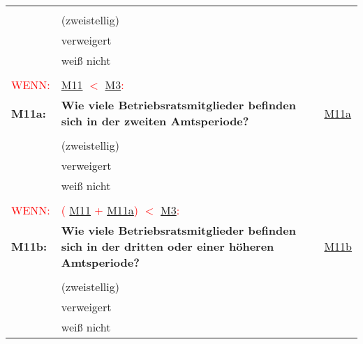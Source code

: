 \begin{longtable}{!{\color{black}\vline width 1pt}  L{2cm}!{\color{black}\vline width 1pt} L{12.25cm}!{\color{black}\vline width 1pt}  L{2.5cm}!{\color{black}\vline width 1pt}}
   &  &  \\ 
   & (zweistellig) &  \\ 
   & verweigert &  \\ 
   & weiß nicht &  \\ 
   &  &  \\ 
   \midrule
{}\textcolor{red}{WENN:} & \textcolor{red}{ \hyperref[M11]{M11} $<$  \hyperref[M3]{M3}:} &  \\ 
  \textbf{M11a:}\label{M11a} & \textbf{Wie viele Betriebsratsmitglieder befinden sich in der zweiten Amtsperiode?} & \hyperref[var:M11a]{M11a} \\ 
   &  &  \\ 
   & (zweistellig) &  \\ 
   & verweigert &  \\ 
   & weiß nicht &  \\ 
   &  &  \\ 
   \midrule
{}\textcolor{red}{WENN:} & \textcolor{red}{( \hyperref[M11]{M11} +  \hyperref[M11a]{M11a}) $<$  \hyperref[M3]{M3}:} &  \\ 
  \textbf{M11b:}\label{M11b} & \textbf{Wie viele Betriebsratsmitglieder befinden sich in der dritten oder einer höheren Amtsperiode?} & \hyperref[var:M11b]{M11b} \\ 
   &  &  \\ 
   & (zweistellig) &  \\ 
   & verweigert &  \\ 
   & weiß nicht &  \\ 

\end{longtable}
